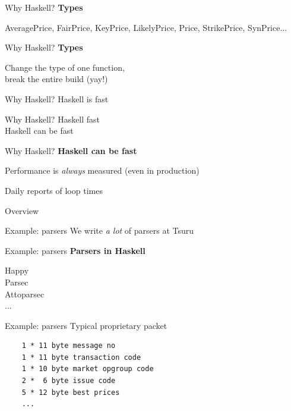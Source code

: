 \documentclass[20pt]{beamer}
\newcommand{\vspaced}{
    \vspace{5mm}
}
\begin{document}
\begin{frame}[fragile]{Why Haskell?}
    \textbf{Types} \\
    \vspaced
    AveragePrice, FairPrice, KeyPrice, LikelyPrice, Price, StrikePrice,
    SynPrice...
\end{frame}

\begin{frame}[fragile]{Why Haskell?}
    \textbf{Types} \\
    \vspaced
    Change the type of one function, \\
    break the entire build (yay!) \\
\end{frame}

\begin{frame}{Why Haskell?}
    Haskell is fast
\end{frame}

\begin{frame}{Why Haskell?}
    Haskell  fast \\
    Haskell can be fast
\end{frame}

\begin{frame}{Why Haskell?}
    \textbf{Haskell can be fast} \\
    \vspaced
    Performance is \emph{always} measured (even in production) \\
    \vspaced
    Daily reports of loop times
\end{frame}


\begin{frame}{Overview}
\end{frame}

\begin{frame}{Example: parsers}
    We write \emph{a lot} of parsers at Tsuru
\end{frame}

\begin{frame}{Example: parsers}
    \textbf{Parsers in Haskell} \\
    \vspaced
    Happy \\
    Parsec \\
    Attoparsec \\
    ... \\
\end{frame}

\begin{frame}[fragile]{Example: parsers}
    Typical proprietary packet \\
    \vspaced
    \begin{lstlisting}
    1 * 11 byte message no
    1 * 11 byte transaction code
    1 * 10 byte market opgroup code
    2 *  6 byte issue code
    5 * 12 byte best prices
    ...
    \end{lstlisting}
\end{frame}
\end{document}
